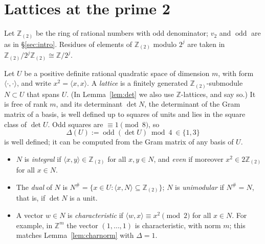 \documentclass[11pt]{article}
\theoremstyle{definition}
\theoremstyle{remark}
\newcommand{\Z}{\mathbb Z}
\newcommand{\Zt}{\Z_{(2)}}
\newcommand{\ip}[2]{\langle #1,#2\rangle}
\newcommand{\odd}{\operatorname{odd}}
\begin{document}
\section{Lattices at the prime 2}\label{sec:lattices}

Let $\Zt$ be the ring of rational numbers with odd denominator; $v_2$ and
$\odd$ are as in \S\ref{sec:intro}. Residues of elements of $\Zt$ modulo $2^j$ are taken in
$\Zt/2^j\Zt\cong\Z/2^j$.

Let $U$ be a positive definite rational quadratic space of dimension $m$, with
form $\ip{\cdot}{\cdot}$, and write $x^2=\ip xx$. A \emph{lattice} is a
finitely generated $\Zt$-submodule $N\subset U$ that spans $U$. (In
Lemma~\ref{lem:det} we also use $\Z$-lattices, and say so.) It is free of rank
$m$, and its determinant $\det N$, the determinant of the Gram matrix of a
basis, is well defined up to squares of units and lies in the square class of
$\det U$. Odd squares are $\equiv1\pmod 8$, so
\[
 \Delta(U):=\odd(\det U)\bmod 4\ \in\{1,3\}
\]
is well defined; it can be computed from the Gram matrix of any basis of $U$.
\begin{itemize}
\item $N$ is \emph{integral} if $\ip xy\in\Zt$ for all $x,y\in N$, and
\emph{even} if moreover $x^2\in2\Zt$ for all $x\in N$.
\item The \emph{dual} of $N$ is $N^\#=\{x\in U:\ip xN\subseteq\Zt\}$; $N$ is
\emph{unimodular} if $N^\#=N$, that is, if $\det N$ is a unit.
\item A vector $w\in N$ is \emph{characteristic} if $\ip wx\equiv x^2\pmod 2$
for all $x\in N$. For example, in $\Z^m$ the vector $(1,\dots,1)$ is
characteristic, with norm $m$; this matches Lemma~\ref{lem:charnorm} with
$\Delta=1$.
\end{itemize}
\end{document}
